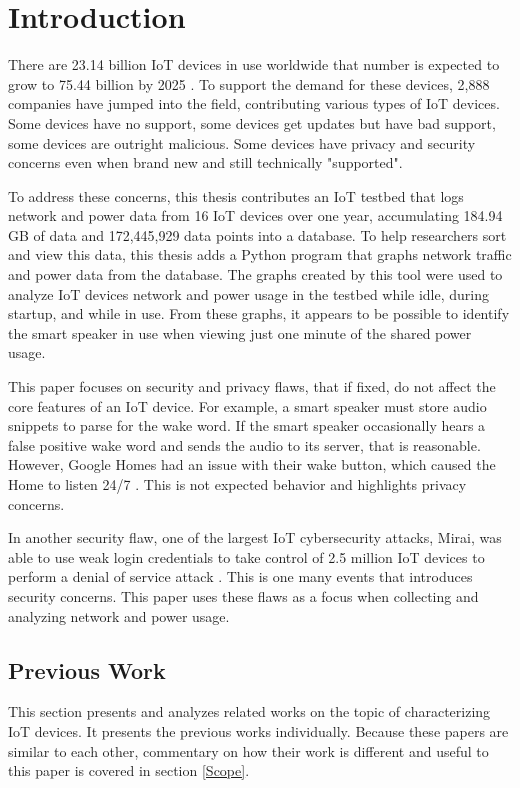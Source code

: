 \chapter{Introduction}
\label{Introduction}
There are 23.14 billion IoT devices in use worldwide that number is expected to grow to 75.44 billion by 2025 \cite{statista_2016}. To support the demand for these devices, 2,888 companies have jumped into the field, contributing various types of IoT devices. Some devices have no support, some devices get updates but have bad support, some devices are outright malicious. Some devices have privacy and security concerns even when brand new and still technically "supported".

To address these concerns, this thesis contributes an IoT testbed that logs network and power data from 16 IoT devices over one year, accumulating 184.94 GB of data and 172,445,929 data points into a database. To help researchers sort and view this data, this thesis adds a Python \cite{python} program that graphs network traffic and power data from the database. The graphs created by this tool were used to analyze IoT devices network and power usage in the testbed while idle, during startup, and while in use. From these graphs, it appears to be possible to identify the smart speaker in use when viewing just one minute of the shared power usage.

This paper focuses on security and privacy flaws, that if fixed, do not affect the core features of an IoT device. For example, a smart speaker must store audio snippets to parse for the wake word. If the smart speaker occasionally hears a false positive wake word and sends the audio to its server, that is reasonable. However, Google Homes had an issue with their wake button, which caused the Home to listen 24/7 \cite{burke_2017}. This is not expected behavior and highlights privacy concerns.

In another security flaw, one of the largest IoT cybersecurity attacks, Mirai, was able to use weak login credentials to take control of 2.5 million IoT devices to perform a denial of service attack \cite{whittaker_2017}. This is one many events that introduces security concerns. This paper uses these flaws as a focus when collecting and analyzing network and power usage.

\section{Previous Work}
\label{Previous Work}
This section presents and analyzes related works on the topic of characterizing IoT devices. It presents the previous works individually. Because these papers are similar to each other, commentary on how their work is different and useful to this paper is covered in section \ref{Scope}.

